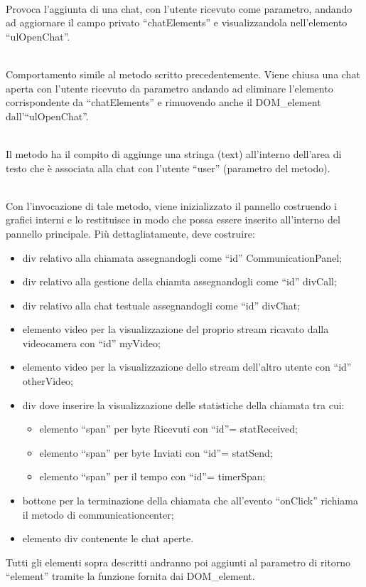 \begin{description}
\item{}\\
Provoca l'aggiunta di una chat, con l'utente ricevuto come parametro, andando ad aggiornare il campo privato ``chatElements'' e visualizzandola nell'elemento ``ulOpenChat''.
	
\item{}\\
Comportamento simile al metodo scritto precedentemente. Viene chiusa una chat aperta con l'utente ricevuto da parametro andando ad eliminare l'elemento corrispondente da ``chatElements'' e rimuovendo anche il DOM\_element dall'``ulOpenChat''.

\item{}\\
Il metodo ha il compito di aggiunge una stringa (text) all'interno dell'area di testo che è associata alla chat con l'utente ``user'' (parametro del metodo).

\item{}\\
Con l'invocazione di tale metodo, viene inizializzato il pannello costruendo i  grafici interni e lo restituisce in modo che possa essere inserito all'interno del pannello principale. Più dettagliatamente, deve costruire:
\begin{itemize}
\item div relativo alla chiamata assegnandogli come ``id'' CommunicationPanel;
\item div relativo alla gestione della chiamta assegnandogli come ``id'' divCall;
\item div relativo alla chat testuale assegnandogli come ``id'' divChat;
\item elemento video per la visualizzazione del proprio stream ricavato dalla videocamera con ``id'' myVideo;
\item elemento video per la visualizzazione dello stream dell'altro utente con ``id'' otherVideo;
\item div dove inserire la visualizzazione delle statistiche della chiamata tra cui:
\begin{itemize}
\item elemento ``span'' per byte Ricevuti con ``id''= statReceived;
\item elemento ``span'' per byte Inviati con ``id''= statSend;
\item elemento ``span'' per il tempo con ``id''= timerSpan;
\end{itemize}
\item bottone per la terminazione della chiamata che all'evento ``onClick'' richiama il metodo  di communicationcenter;
\item elemento div contenente le chat aperte.
\end{itemize}
Tutti gli elementi sopra descritti andranno poi aggiunti al parametro di ritorno ``element'' tramite la funzione  fornita dai DOM\_element.


\end{description}
